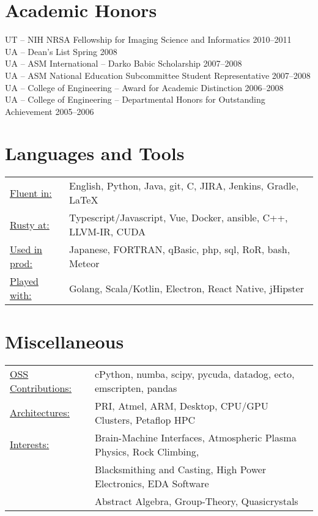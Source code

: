 \documentclass{res}
\begin{document}
\begin{resume}
\section{Academic Honors}
UT -- NIH NRSA Fellowship for Imaging Science and Informatics \hfill 2010--2011 \\
UA -- Dean’s List \hfill Spring 2008 \\
UA -- ASM International -- Darko Babic Scholarship \hfill 2007--2008 \\
UA -- ASM National Education Subcommittee Student Representative \hfill 2007--2008 \\
UA -- College of Engineering -- Award for Academic Distinction \hfill 2006--2008 \\
UA -- College of Engineering -- Departmental Honors for Outstanding Achievement \hfill 2005--2006

\section{Languages and Tools}
 \begin{tabular}{l p{5.5in}}
   \underline{Fluent in:}    & English, Python, Java, git, C, JIRA, Jenkins, Gradle, \LaTeX \\
   \underline{Rusty at:}     & Typescript/Javascript, Vue, Docker, ansible, C++, LLVM-IR, CUDA \\
   \underline{Used in prod:} & Japanese, FORTRAN, qBasic, php, sql, RoR, bash, Meteor \\
   \underline{Played with:}  & Golang, Scala/Kotlin, Electron, React Native, jHipster
 \end{tabular}

\section{Miscellaneous}
  \begin{tabular}{l p{5.5in}}
    \underline{OSS Contributions:} & cPython, numba, scipy, pycuda, datadog, ecto, emscripten, pandas  \\
    \underline{Architectures:}     & PRI, Atmel, ARM, Desktop, CPU/GPU Clusters, Petaflop HPC \\
    \underline{Interests:}         & Brain-Machine Interfaces, Atmospheric Plasma Physics, Rock Climbing, \\
                                   & Blacksmithing and Casting, High Power Electronics, EDA Software \\
                                   & Abstract Algebra, Group-Theory, Quasicrystals
 \end{tabular}

\end{resume}
\end{document}
